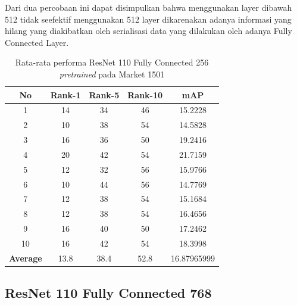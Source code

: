 Dari dua percobaan ini dapat disimpulkan bahwa menggunakan layer dibawah 512 tidak seefektif menggunakan 512 layer dikarenakan adanya informasi yang hilang yang diakibatkan oleh serialisasi data yang dilakukan oleh adanya Fully Connected Layer.
\begin{longtable}{|c|c|c|c|c|}
	\caption{Rata-rata performa ResNet 110 Fully Connected 256 \textit{pretrained} pada Market 1501 }
	\label{tabel: 15}\\
	\hline
	\rowcolor[HTML]{C0C0C0}
	\textbf{No} &\textbf{Rank-1} & \textbf{Rank-5} & \textbf{Rank-10} & \textbf{mAP} \\
	\hline
	1 &14 &34 &46 &15.2228 \\
	2 &10 &38 &54 &14.5828 \\
	3 &16 &36 &50 &19.2416 \\
	4 &20 &42 &54 &21.7159 \\
	5 &12 &32 &56 &15.9766 \\
	6 &10 &44 &56 &14.7769 \\
	7 &12 &38 &54 &15.1684 \\
	8 &12 &38 &54 &16.4656 \\
	9 &16 &40 &50 &17.2462 \\
	10 &16 &42 &54 &18.3998 \\
	\hline
	\textbf{Average} & 13.8 & 38.4 & 52.8 &16.87965999 \\
	\hline
\end{longtable}

\subsection{ResNet 110 Fully Connected 768}

